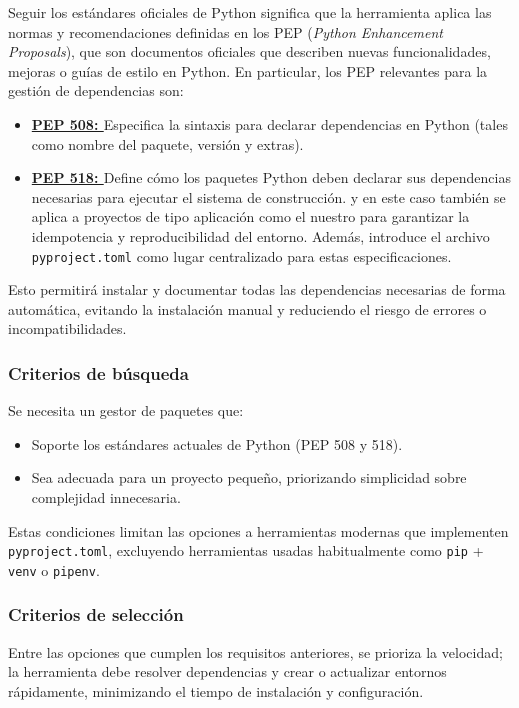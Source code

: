 Seguir los estándares oficiales de Python significa que la herramienta aplica las normas y recomendaciones
definidas en los PEP (\textit{Python Enhancement Proposals}), que son documentos oficiales que describen 
nuevas funcionalidades, mejoras o guías de estilo en Python. En particular, los PEP relevantes para la
gestión de dependencias son:

\begin{itemize}
    \item \textbf{\href{https://peps.python.org/pep-0508/}{PEP 508: }} Especifica la sintaxis 
    para declarar dependencias en Python (tales como nombre del paquete, versión y extras).
    \item \textbf{\href{https://peps.python.org/pep-0518/}{PEP 518: }} Define cómo los paquetes 
    Python deben declarar sus dependencias necesarias para ejecutar el sistema de construcción. y en este 
    caso también se aplica a proyectos de tipo aplicación como el nuestro para garantizar la idempotencia 
    y reproducibilidad del entorno. Además, introduce el archivo \texttt{pyproject.toml} como lugar 
    centralizado para estas especificaciones.
\end{itemize}

Esto permitirá instalar y documentar todas las dependencias necesarias de forma automática,
evitando la instalación manual y reduciendo el riesgo de errores o incompatibilidades. 

\subsubsection{Criterios de búsqueda}
Se necesita un gestor de paquetes que:
\begin{itemize}
    \item Soporte los estándares actuales de Python (PEP 508 y 518).
    \item Sea adecuada para un proyecto pequeño, priorizando simplicidad sobre complejidad 
    innecesaria.
\end{itemize}
Estas condiciones limitan las opciones a herramientas modernas que implementen \texttt{pyproject.toml},
excluyendo herramientas usadas habitualmente como \texttt{pip} + \texttt{venv} o \texttt{pipenv}.

\subsubsection{Criterios de selección}
Entre las opciones que cumplen los requisitos anteriores, se prioriza la velocidad; la herramienta 
debe resolver dependencias y crear o actualizar entornos rápidamente, minimizando el tiempo de 
instalación y configuración.

